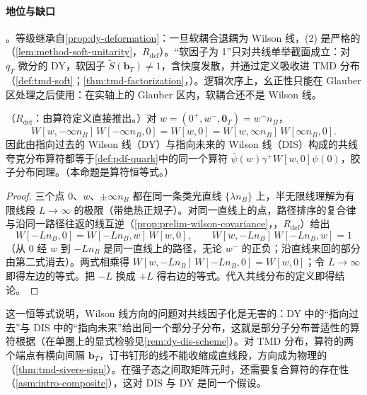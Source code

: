 \paragraph{地位与缺口}\tagA。等级继承自\cref{prop:dy-deformation}：一旦软耦合退耦为 Wilson 线，(2) 是严格的（\cref{lem:method-soft-unitarity}，$R_{\mathrm{def}}$）。“软因子为 1”只对共线单举截面成立：对 $q_T$ 微分的 DY，软因子 $\tilde S(\mathbf b_T)\neq1$，含快度发散，并通过定义吸收进 TMD 分布（\cref{def:tmd-soft}；\cref{thm:tmd-factorization}，\tagA）。逻辑次序上，幺正性只能在 Glauber 区处理之后使用：在实轴上的 Glauber 区内，软耦合还不是 Wilson 线。

\begin{proposition}\label{prop:dy-universality}
（$R_{\mathrm{def}}$：由算符定义直接推出。）对 $w=(0^+,w^-,\mathbf 0_T)=w^-n_B$，
\begin{equation}\label{eq:dy-universality}
W[w,-\infty n_B]\,W[-\infty n_B,0]=W[w,0]=W[w,\infty n_B]\,W[\infty n_B,0] .
\end{equation}
因此由指向过去的 Wilson 线（DY）与指向未来的 Wilson 线（DIS）构成的共线夸克分布算符都等于\cref{def:pdf-quark}中的同一个算符 $\bar\psi(w)\gamma^+W[w,0]\psi(0)$，胶子分布同理。（本命题是算符恒等式。）
\end{proposition}

\begin{proof}
三个点 $0$、$w$、$\pm\infty n_B$ 都在同一条类光直线 $\{\lambda n_B\}$ 上，半无限线理解为有限线段 $L\to\infty$ 的极限（带绝热正规子）。对同一直线上的点，路径排序的复合律与沿同一路径往返的线互逆（\cref{prop:prelim-wilson-covariance}，\tagR，$R_{\mathrm{def}}$）给出
\[
W[-Ln_B,0]=W[-Ln_B,w]\,W[w,0],\qquad W[w,-Ln_B]\,W[-Ln_B,w]=1
\]
（从 $0$ 经 $w$ 到 $-Ln_B$ 是同一直线上的路径，无论 $w^-$ 的正负；沿直线来回的部分由第二式消去）。两式相乘得 $W[w,-Ln_B]\,W[-Ln_B,0]=W[w,0]$；令 $L\to\infty$ 即得左边的等式。把 $-L$ 换成 $+L$ 得右边的等式。代入共线分布的定义即得结论。
\end{proof}

这一恒等式说明，Wilson 线方向的问题对共线因子化是无害的：DY 中的“指向过去”与 DIS 中的“指向未来”给出同一个部分子分布，这就是部分子分布普适性的算符根据（在单圈上的显式检验见\cref{rem:dy-dis-scheme}）。对 TMD 分布，算符的两个端点有横向间隔 $\mathbf b_T$，订书钉形的线不能收缩成直线段，方向成为物理的（\cref{thm:tmd-sivers-sign}）。在强子态之间取矩阵元时，还需要复合算符的存在性（\cref{asm:intro-composite}），这对 DIS 与 DY 是同一个假设。

